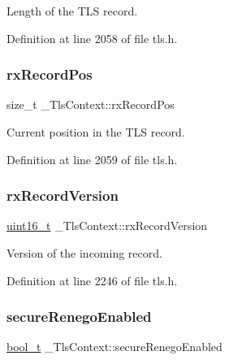 Length of the T\+LS record. 



Definition at line 2058 of file tls.\+h.

\mbox{\label{struct__TlsContext_a659acbce0996a343401d976c75975612}} 
\subsubsection{\texorpdfstring{rx\+Record\+Pos}{rxRecordPos}}
{\footnotesize\ttfamily size\+\_\+t \+\_\+\+Tls\+Context\+::rx\+Record\+Pos}



Current position in the T\+LS record. 



Definition at line 2059 of file tls.\+h.

\mbox{\label{struct__TlsContext_ad61766a5c8676e28222b3320e3e70297}} 
\subsubsection{\texorpdfstring{rx\+Record\+Version}{rxRecordVersion}}
{\footnotesize\ttfamily \hyperlink{stdint_8h_a273cf69d639a59973b6019625df33e30}{uint16\+\_\+t} \+\_\+\+Tls\+Context\+::rx\+Record\+Version}



Version of the incoming record. 



Definition at line 2246 of file tls.\+h.

\mbox{\label{struct__TlsContext_a9cf4eccb7f21850bb7b7729db1028463}} 
\subsubsection{\texorpdfstring{secure\+Renego\+Enabled}{secureRenegoEnabled}}
{\footnotesize\ttfamily \hyperlink{compiler__port_8h_a812d16e5494522586b3784e55d479912}{bool\+\_\+t} \+\_\+\+Tls\+Context\+::secure\+Renego\+Enabled}



